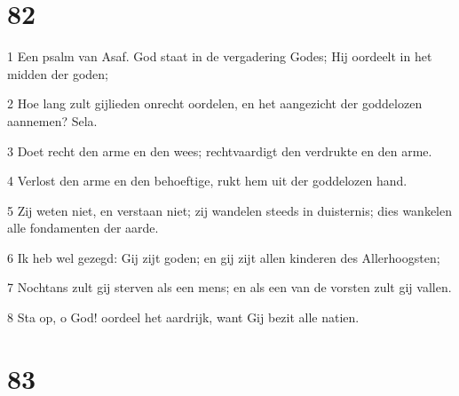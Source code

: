 \chapter{82}

\par 1 Een psalm van Asaf. God staat in de vergadering Godes; Hij oordeelt in het midden der goden;
\par 2 Hoe lang zult gijlieden onrecht oordelen, en het aangezicht der goddelozen aannemen? Sela.
\par 3 Doet recht den arme en den wees; rechtvaardigt den verdrukte en den arme.
\par 4 Verlost den arme en den behoeftige, rukt hem uit der goddelozen hand.
\par 5 Zij weten niet, en verstaan niet; zij wandelen steeds in duisternis; dies wankelen alle fondamenten der aarde.
\par 6 Ik heb wel gezegd: Gij zijt goden; en gij zijt allen kinderen des Allerhoogsten;
\par 7 Nochtans zult gij sterven als een mens; en als een van de vorsten zult gij vallen.
\par 8 Sta op, o God! oordeel het aardrijk, want Gij bezit alle natien.

\chapter{83}

